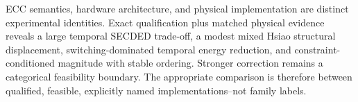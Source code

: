\documentclass[conference,10pt]{IEEEtran}
\begin{document}
ECC semantics, hardware architecture, and physical implementation are distinct experimental identities. Exact qualification plus matched physical evidence reveals a large temporal SECDED trade-off, a modest mixed Hsiao structural displacement, switching-dominated temporal energy reduction, and constraint-conditioned magnitude with stable ordering. Stronger correction remains a categorical feasibility boundary. The appropriate comparison is therefore between qualified, feasible, explicitly named implementations--not family labels.

\clearpage
{}


\end{document}
